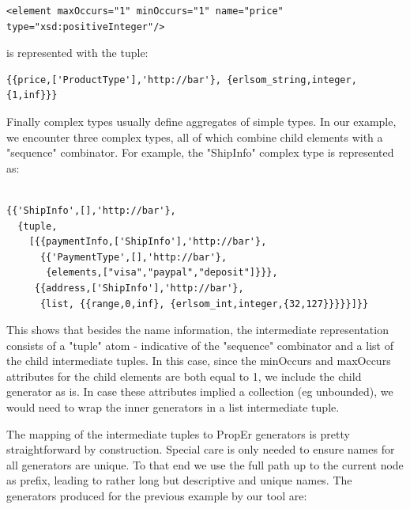 \documentclass[submission,copyright,a4]{eptcs}
\begin{document}
\begin{lstlisting}
<element maxOccurs="1" minOccurs="1" name="price" type="xsd:positiveInteger"/>
\end{lstlisting}

is represented with the tuple:

\begin{lstlisting}
{{price,['ProductType'],'http://bar'}, {erlsom_string,integer,{1,inf}}}
\end{lstlisting}

Finally complex types usually define aggregates of simple types. In our example, we encounter three complex types, all of which combine child elements with a "sequence" combinator. For example, the "ShipInfo" complex type is represented as:

\begin{lstlisting}

{{'ShipInfo',[],'http://bar'},
  {tuple,
    [{{paymentInfo,['ShipInfo'],'http://bar'},
      {{'PaymentType',[],'http://bar'},
       {elements,["visa","paypal","deposit"]}}},
     {{address,['ShipInfo'],'http://bar'},
      {list, {{range,0,inf}, {erlsom_int,integer,{32,127}}}}}]}}
\end{lstlisting}

This shows that besides the name information, the intermediate representation consists of a "tuple" atom - indicative of the "sequence" combinator and a list of the child intermediate tuples. In this case, since the minOccurs and maxOccurs attributes for the child elements are both equal to 1, we include the child generator as is. In case these attributes implied a collection (eg unbounded), we would need to wrap the inner generators in a list intermediate tuple.


The mapping of the intermediate tuples to PropEr generators is pretty straightforward by construction. Special care is only needed to ensure names for all generators are unique. To that end we use the full path up to the current node as prefix, leading to rather long but descriptive and unique names. The generators produced for the previous example by our tool are:
\end{document}
